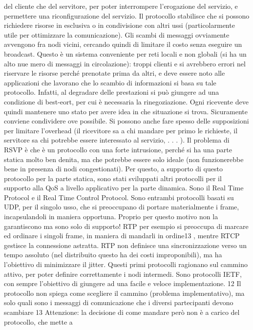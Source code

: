 del cliente che del servitore, per poter interrompere l'erogazione del servizio,
e permettere una riconfigurazione del servizio. Il protocollo stabilisce che si
possono richiedere risorse in esclusiva o in condivisione con altri ussi (particolarmente utile per ottimizzare la
comunicazione). Gli scambi di messaggi
ovviamente avvengono fra nodi vicini, cercando quindi di limitare il costo senza
eseguire un broadcast.
Questo è un sistema conveniente per reti locali e non globali (si ha un alto nue
mero di messaggi in circolazione): troppi clienti e si avrebbero errori nel riservare
le risorse perché prenotate prima da altri, e deve essere noto alle applicazioni
che lavorano che lo scambio di informazioni si basa su tale protocollo. Infatti,
al degradare delle prestazioni si può giungere ad una condizione di best-eort,
per cui è necessaria la rinegoziazione. Ogni ricevente deve quindi mantenere
uno stato per avere idea in che situazione si trova. Sicuramente conviene condividere ove possibile. Si possono anche
fare spesso delle supposizioni per limitare
l'overhead (il ricevitore sa a chi mandare per primo le richieste, il servitore sa
chi potrebbe essere interessato al servizio, . . . ).
Il problema di RSVP è che è un protocollo con una forte intrusione, perché si
ha una parte statica molto ben denita, ma che potrebbe essere solo ideale (non
funzionerebbe bene in presenza di nodi congestionati). Per questo, a supporto
di questo protocollo per la parte statica, sono stati sviluppati altri protocolli
per il supporto alla QoS a livello applicativo per la parte dinamica. Sono il Real
Time Protocol e il Real Time Control Protocol. Sono entrambi protocolli basati
su UDP, per il singolo usso, che si preoccupano di portare materialmente i
frame, incapsulandoli in maniera opportuna. Proprio per questo motivo non
la garantiscono ma sono solo di supporto! RTP per esempio si preoccupa di
marcare ed ordinare i singoli frame, in maniera di mandarli in ordine13 , mentre
RTCP gestisce la connessione astratta.
RTP non definisce una sincronizzazione verso un tempo assoluto (nel distribuito questo ha dei costi improponibili), ma ha
l'obiettivo di minimizzare il
jitter. Questi primi protocolli ragionano sul cammino attivo, per poter definire
correttamente i nodi intermedi. Sono protocolli IETF, con sempre l'obiettivo di
giungere ad una facile e veloce implementazione.
12 Il protocollo non spiega come scegliere il cammino (problema implementativo), ma solo
quali sono i messaggi di comunicazione che i diversi partecipanti devono scambiare
13 Attenzione: la decisione di come mandare però non è a carico del protocollo, che mette a
